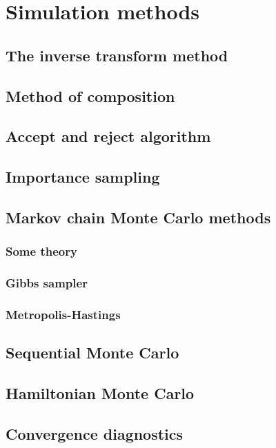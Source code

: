 \chapter{Simulation methods}\label{chap5}

\section{The inverse transform method}\label{sec51}

\section{Method of composition}\label{sec52}

\section{Accept and reject algorithm}\label{sec53}

\section{Importance sampling}\label{sec54}

\section{Markov chain Monte Carlo methods}\label{sec55}

\subsection{Some theory}\label{sec551}

\subsection{Gibbs sampler}\label{sec552}

\subsection{Metropolis-Hastings}\label{sec553}

\section{Sequential Monte Carlo}\label{sec56}

\section{Hamiltonian Monte Carlo}\label{sec57}

\section{Convergence diagnostics}\label{sec58}